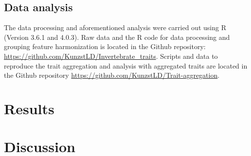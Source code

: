 \documentclass{article}
\begin{document}

\subsection*{Data analysis}

The data processing and aforementioned analysis were carried out using R (Version 3.6.1 and 4.0.3). Raw data and the R code for data processing and grouping feature harmonization is located in the Github repository: \url{https://github.com/KunzstLD/Invertebrate_traits}. Scripts and data to reproduce the trait aggregation and analysis with aggregated traits are located in the Github repository \url{https://github.com/KunzstLD/Trait-aggregation}.


\newpage
\section*{Results}



\newpage 


\newpage 


\newpage 




\section*{Discussion}
\end{document}
